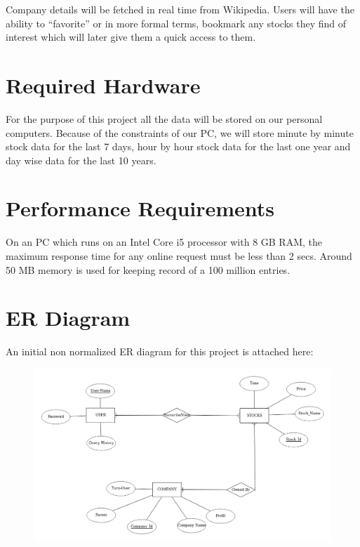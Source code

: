 \documentclass{report}
\begin{document}
Company details will be fetched in real time from Wikipedia.
Users will have the ability to “favorite” or in more formal terms, bookmark any stocks they find of interest which will later give them a quick access to them.

\section{ Required Hardware}
For the purpose of this project all the data will be stored on our personal computers. Because of the constraints of our PC, we will store minute by minute stock data for the last 7 days, hour by hour stock data for the last one year and day wise data for the last 10 years.

\section{Performance Requirements}
On an PC which runs on an Intel Core i5 processor with 8 GB RAM, the maximum response time for any online request must be less than 2 secs. Around 50 MB memory is used for keeping record of a 100 million entries.

\section{ ER Diagram}
An initial non normalized ER diagram for this project is attached here: 
\begin{figure}[H]
	\includegraphics[scale=0.35]{erd1.png}
\end{figure}
\end{document}
